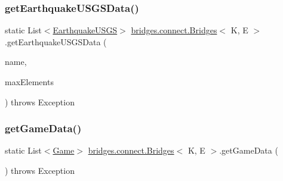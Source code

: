 \hypertarget{classbridges_1_1connect_1_1_bridges_afd68bf25a3f61e731f603da67fbdcecc}{}\label{classbridges_1_1connect_1_1_bridges_afd68bf25a3f61e731f603da67fbdcecc} 
\subsubsection{\texorpdfstring{get\+Earthquake\+U\+S\+G\+S\+Data()}{getEarthquakeUSGSData()}}
{\footnotesize\ttfamily static List$<$\hyperlink{classbridges_1_1data__src__dependent_1_1_earthquake_u_s_g_s}{Earthquake\+U\+S\+GS}$>$ \hyperlink{classbridges_1_1connect_1_1_bridges}{bridges.\+connect.\+Bridges}$<$ K, E $>$.get\+Earthquake\+U\+S\+G\+S\+Data (\begin{DoxyParamCaption}\item[{\hyperlink{classbridges_1_1data__src__dependent_1_1_u_s_g_saccount}{U\+S\+G\+Saccount}}]{name,  }\item[{int}]{max\+Elements }\end{DoxyParamCaption}) throws Exception\hspace{0.3cm}{\ttfamily [static]}}

\hypertarget{classbridges_1_1connect_1_1_bridges_abcd1c3465d8963cd635a63e248f33525}{}\label{classbridges_1_1connect_1_1_bridges_abcd1c3465d8963cd635a63e248f33525} 
\subsubsection{\texorpdfstring{get\+Game\+Data()}{getGameData()}}
{\footnotesize\ttfamily static List$<$\hyperlink{classbridges_1_1data__src__dependent_1_1_game}{Game}$>$ \hyperlink{classbridges_1_1connect_1_1_bridges}{bridges.\+connect.\+Bridges}$<$ K, E $>$.get\+Game\+Data (\begin{DoxyParamCaption}{ }\end{DoxyParamCaption}) throws Exception\hspace{0.3cm}{\ttfamily [static]}}

\hypertarget{classbridges_1_1connect_1_1_bridges_a123d445316be7e9927b5642a3b8c71ba}{}\label{classbridges_1_1connect_1_1_bridges_a123d445316be7e9927b5642a3b8c71ba} 
